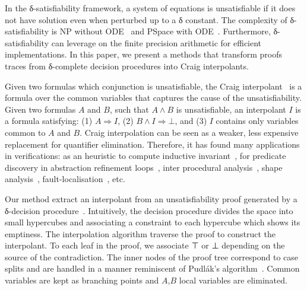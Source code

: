 In the δ-satisfiability framework, a system of equations is unsatisfiable if it does not have solution even when perturbed up to a δ constant.
The complexity of δ-satisfiability is NP without ODE~\cite{DBLP:conf/lics/GaoAC12} and PSpace with ODE~\cite{DBLP:conf/fmcad/GaoKC13}.
Furthermore, δ-satisfiability can leverage on the finite precision arithmetic for efficient implementations.
In this paper, we present a methods that transform proofs traces from δ-complete decision procedures into Craig interpolants.


Given two formulas which conjunction is unsatisfiable, the Craig interpolant~\cite{MR0104564} is a formula over the common variables that captures the cause of the unsatisfiability.
Given two formulas $A$ and $B$, such that $A ∧ B$ is unsatisfiable, an interpolant $I$ is a formula satisfying: (1) $A ⇒ I$, (2) $B ∧ I ⇒ ⊥$, and (3) $I$ contains only variables common to $A$ and $B$.
Craig interpolation can be seen as a weaker, less expensive replacement for quantifier elimination.
Therefore, it has found many applications in verifications:
as an heuristic to compute inductive invariant~\cite{DBLP:conf/cav/McMillan03,DBLP:conf/vmcai/McMillan07,DBLP:conf/sas/McMillan11},
for predicate discovery in abstraction refinement loops~\cite{DBLP:conf/cav/McMillan06},
inter procedural analysis~\cite{DBLP:conf/vmcai/AlbarghouthiGC12,DBLP:conf/cav/AlbarghouthiLGC12},
shape analysis~\cite{DBLP:conf/esop/AlbarghouthiBCK15},
fault-localisation~\cite{DBLP:conf/fm/ErmisSW12,DBLP:conf/vmcai/ChristESW13,DBLP:conf/sigsoft/SchafSW13}, etc.

Our method extract an interpolant from an unsatisfiability proof generated by a δ-decision procedure~\cite{DBLP:conf/synasc/GaoKC14}.
Intuitively, the decision procedure divides the space into small hypercubes and associating a constraint to each hypercube which shows its emptiness.
The interpolation algorithm traverse the proof to construct the interpolant.
To each leaf in the proof, we associate ⊤ or ⊥ depending on the source of the contradiction.
The inner nodes of the proof tree correspond to case splits and are handled in a manner reminiscent of Pudl{\'a}k's algorithm~\cite{MR1472134}.
Common variables are kept as branching points and $A$,$B$ local variables are eliminated.

